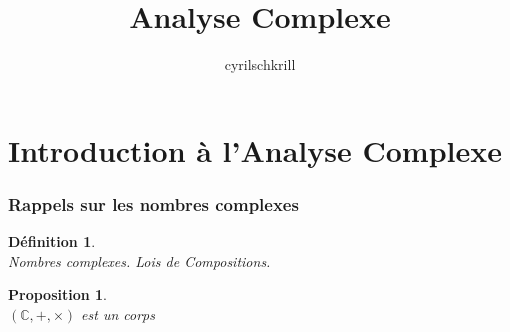 \documentclass{article}
\title{Analyse Complexe}
\author{cyrilschkrill}
\newtheorem{definition}{Définition}
\newtheorem{proposition}{Proposition}
\begin{document}
\maketitle
\part{Introduction à l'Analyse Complexe}



\section{Rappels sur les nombres complexes}
\begin{definition} \text{ } \\
	Nombres complexes. Lois de Compositions.
\end{definition}

\begin{proposition}  \text{ } \\
	$ ( \mathbb{C},+,\times ) $ est un corps 
\end{proposition}
\end{document}
